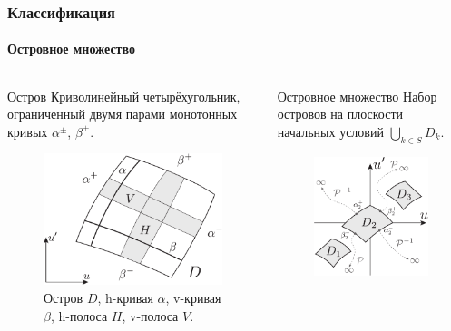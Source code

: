 \documentclass [10pt] {beamer}
\begin{document}
\begin{frame}
	\frametitle{Классификация}
	\framesubtitle{Островное множество}
	
	\begin{columns}[T]
		\begin{column}{.47\textwidth}
			\begin{block}{Остров}
				Криволинейный четырёхугольник, ограниченный двумя парами монотонных кривых $\alpha^{\pm}$, $\beta^{\pm}$.
			\end{block}		
			\begin{figure}
			\includegraphics[height = 0.4\textheight]{pic/curves and strips.pdf}
			\caption{Остров $D$, h-кривая $\alpha$, v-кривая $\beta$, h-полоса $H$, v-полоса $V$.}
			\end{figure}
		\end{column}
		\begin{column}{.46\textwidth}
			\begin{block}{Островное множество}
				Набор островов на плоскости начальных условий $\bigcup_{k \in S} D_k$.
			\end{block}
			\vspace{10pt}
			\begin{figure}
			\includegraphics[height = 0.4\textheight]{pic/island set.pdf}

\end{figure}
\end{column}
\end{columns}
\end{frame}
\end{document}
